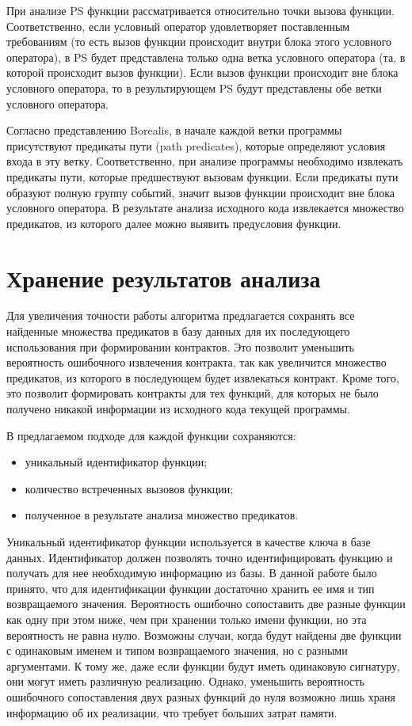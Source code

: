 При анализе PS функции рассматривается относительно точки вызова функции. Соответственно, если условный оператор удовлетворяет поставленным требованиям (то есть вызов функции происходит внутри блока этого условного оператора), в PS будет представлена только одна ветка условного оператора (та, в которой происходит вызов функции). Если вызов функции происходит вне блока условного оператора, то в результирующем PS будут представлены обе ветки условного оператора.

Согласно представлению Borealis, в начале каждой ветки программы присутствуют предикаты пути (path predicates), которые определяют условия входа в эту ветку. Соответственно, при анализе программы необходимо извлекать предикаты пути, которые предшествуют вызовам функции. Если предикаты пути образуют полную группу событий, значит вызов функции происходит вне блока условного оператора. В результате анализа исходного кода извлекается множество предикатов, из которого далее можно выявить предусловия функции.

\section{Хранение результатов анализа}
\label{section:saving}
Для увеличения точности работы алгоритма предлагается сохранять все найденные множества предикатов в базу данных для их последующего использования при формировании контрактов. Это позволит уменьшить вероятность ошибочного извлечения контракта, так как увеличится множество предикатов, из которого в последующем будет извлекаться контракт. Кроме того, это позволит формировать контракты для тех функций, для которых не было получено никакой информации из исходного кода текущей программы.

В предлагаемом подходе для каждой функции сохраняются:
\begin{itemize}
\item уникальный идентификатор функции;
\item количество встреченных вызовов функции;
\item полученное в результате анализа множество предикатов.
\end{itemize}

Уникальный идентификатор функции используется в качестве ключа в базе данных. Идентификатор должен позволять точно идентифицировать функцию и получать для нее необходимую информацию из базы. В данной работе было принято, что для идентификации функции достаточно хранить ее имя и тип возвращаемого значения. Вероятность ошибочно сопоставить две разные функции как одну при этом ниже, чем при хранении только имени функции, но эта вероятность не равна нулю. Возможны случаи, когда будут найдены две функции с одинаковым именем и типом возвращаемого значения, но с разными аргументами. К тому же, даже если функции будут иметь одинаковую сигнатуру, они могут иметь различную реализацию. Однако, уменьшить вероятность ошибочного сопоставления двух разных функций до нуля возможно лишь храня информацию об их реализации, что требует больших затрат памяти.

